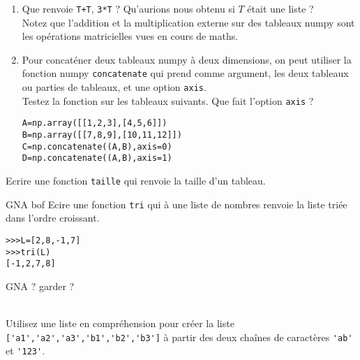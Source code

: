\begin{exercice}
\begin{enumerate}
\item Que renvoie \verb?T+T?, \verb?3*T? ? Qu'aurions nous obtenu si $T$ \' etait une liste ?\\
Notez que l'addition et la multiplication externe sur des tableaux numpy sont les op\' erations matricielles vues en cours de maths.
\item Pour concat\' ener deux tableaux numpy \` a deux dimensions, on peut utiliser la fonction numpy \verb?concatenate? qui prend comme argument, les deux tableaux ou parties de tableaux, et une option \verb?axis?.\\
Testez la fonction sur les tableaux suivants. Que fait l'option \verb?axis? ?
\begin{verbatim}
A=np.array([[1,2,3],[4,5,6]])
B=np.array([[7,8,9],[10,11,12]])
C=np.concatenate((A,B),axis=0)
D=np.concatenate((A,B),axis=1)
\end{verbatim}
\end{enumerate}
\end{exercice}

\begin{exercice}
Ecrire une fonction \verb?taille? qui renvoie la taille d'un tableau.
\end{exercice}



\begin{exercice}GNA bof
Ecire une fonction \verb?tri? qui \` a une liste de nombres renvoie la liste tri\' ee dans l'ordre croissant.
\begin{verbatim}
>>>L=[2,8,-1,7]
>>>tri(L)
[-1,2,7,8]
\end{verbatim}

\end{exercice}



GNA ? garder ?
\begin{exercice}~\\
Utilisez une liste en compr\' ehension pour cr\' eer la liste \verb?['a1','a2','a3','b1','b2','b3']? \` a partir des deux cha\^ ines de caract\` eres \verb?'ab'? et \verb?'123'?.
\end{exercice}

